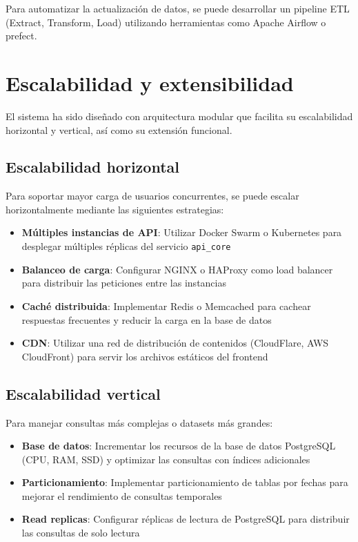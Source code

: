 Para automatizar la actualización de datos, se puede desarrollar un pipeline ETL (Extract, Transform, Load) utilizando herramientas como Apache Airflow o prefect.


\section{Escalabilidad y extensibilidad}
\label{sec:chp7-7}

El sistema ha sido diseñado con arquitectura modular que facilita su escalabilidad horizontal y vertical, así como su extensión funcional.

\subsection{Escalabilidad horizontal}
\label{subsec:chp7-7-1}

Para soportar mayor carga de usuarios concurrentes, se puede escalar horizontalmente mediante las siguientes estrategias:

\begin{itemize}
    \item \textbf{Múltiples instancias de API}: Utilizar Docker Swarm o Kubernetes para desplegar múltiples réplicas del servicio \lstinline[style=bash]|api_core|
    \item \textbf{Balanceo de carga}: Configurar NGINX o HAProxy como load balancer para distribuir las peticiones entre las instancias
    \item \textbf{Caché distribuida}: Implementar Redis o Memcached para cachear respuestas frecuentes y reducir la carga en la base de datos
    \item \textbf{CDN}: Utilizar una red de distribución de contenidos (CloudFlare, AWS CloudFront) para servir los archivos estáticos del frontend
\end{itemize}

\subsection{Escalabilidad vertical}
\label{subsec:chp7-7-2}

Para manejar consultas más complejas o datasets más grandes:

\begin{itemize}
    \item \textbf{Base de datos}: Incrementar los recursos de la base de datos PostgreSQL (CPU, RAM, SSD) y optimizar las consultas con índices adicionales
    \item \textbf{Particionamiento}: Implementar particionamiento de tablas por fechas para mejorar el rendimiento de consultas temporales
    \item \textbf{Read replicas}: Configurar réplicas de lectura de PostgreSQL para distribuir las consultas de solo lectura
\end{itemize}

